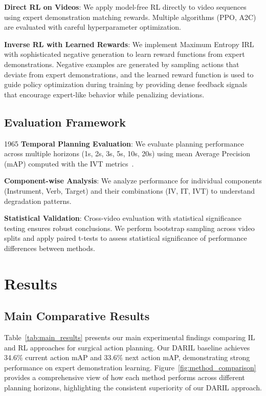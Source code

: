 \documentclass[runningheads]{llncs}
\begin{document}
\textbf{Direct RL on Videos}: We apply model-free RL directly to video sequences using expert demonstration matching rewards. Multiple algorithms (PPO, A2C) are evaluated with careful hyperparameter optimization.

\textbf{Inverse RL with Learned Rewards}: We implement Maximum Entropy IRL~\cite{ziebart2008maximum} with sophisticated negative generation to learn reward functions from expert demonstrations. Negative examples are generated by sampling actions that deviate from expert demonstrations, and the learned reward function is used to guide policy optimization during training by providing dense feedback signals that encourage expert-like behavior while penalizing deviations.

\subsection{Evaluation Framework}
1965
\textbf{Temporal Planning Evaluation}: We evaluate planning performance across multiple horizons (1s, 2s, 3s, 5s, 10s, 20s) using mean Average Precision (mAP) computed with the IVT metrics~\cite{nwoye2022data,nwoye2022cholect50}.

\textbf{Component-wise Analysis}: We analyze performance for individual components (Instrument, Verb, Target) and their combinations (IV, IT, IVT) to understand degradation patterns.

\textbf{Statistical Validation}: Cross-video evaluation with statistical significance testing ensures robust conclusions. We perform bootstrap sampling across video splits and apply paired t-tests to assess statistical significance of performance differences between methods.


\section{Results}

\subsection{Main Comparative Results}

Table~\ref{tab:main_results} presents our main experimental findings comparing IL and RL approaches for surgical action planning. Our DARIL baseline achieves 34.6\% current action mAP and 33.6\% next action mAP, demonstrating strong performance on expert demonstration learning. Figure~\ref{fig:method_comparison} provides a comprehensive view of how each method performs across different planning horizons, highlighting the consistent superiority of our DARIL approach.
\end{document}
